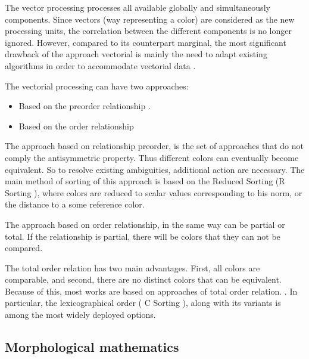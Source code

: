 
The vector processing processes all available globally and simultaneously components.
Since vectors (way representing a color) are considered as the new processing units, the correlation between the different components is no longer ignored. However, compared to its counterpart marginal, the most significant drawback of the approach vectorial is mainly the need to adapt existing algorithms in order to accommodate vectorial data \cite{aptoula2007comparative}. 


The vectorial processing can have two approaches:
 
\begin{itemize}
    \item Based on the preorder relationship .
    \item Based on the order relationship 
\end{itemize}

The approach based on relationship preorder,  is the set of approaches that do not comply the antisymmetric property.  Thus different colors can eventually become equivalent. So to resolve existing ambiguities, additional action are necessary. The main method of sorting of this approach is based on the Reduced Sorting (R Sorting ), where colors are reduced to scalar values corresponding to his norm, or the distance to a some reference color. 


The approach based on order relationship, in the same way can be partial or total. If the relationship is partial, there will be colors that they can not be compared. 

The total order relation has two main advantages. First, all colors are comparable, and second, there are no distinct colors that can be equivalent. Because of this, most works are based on approaches of total order relation. \cite{aptoula2007comparative}. In particular, the lexicographical order ( C Sorting ), along with its variants is among the most widely deployed options.  
 


\subsection{Morphological mathematics}

